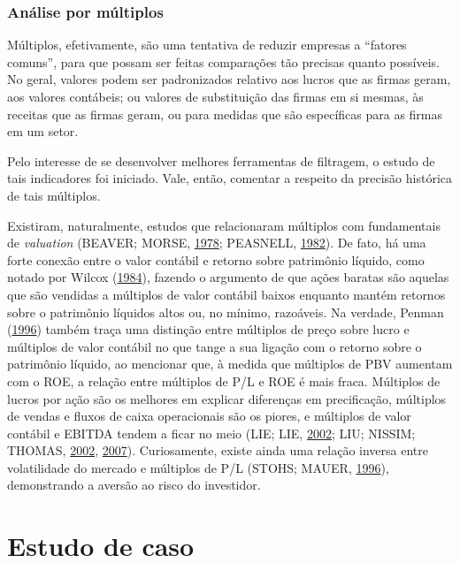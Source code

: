 \documentclass[grad,numbers]{coppe}
\begin{document}
  \hypertarget{anuxe1lise-por-muxfaltiplos}{%
  \subsection{Análise por múltiplos}\label{anuxe1lise-por-muxfaltiplos}}

  Múltiplos, efetivamente, são uma tentativa de reduzir empresas a ``fatores comuns'', para que possam ser feitas comparações tão precisas quanto possíveis. No geral, valores podem ser padronizados relativo aos lucros que as firmas geram, aos valores contábeis; ou valores de substituição das firmas em si mesmas, às receitas que as firmas geram, ou para medidas que são específicas para as firmas em um setor.

  Pelo interesse de se desenvolver melhores ferramentas de filtragem, o estudo de tais indicadores foi iniciado. Vale, então, comentar a respeito da precisão histórica de tais múltiplos.

  Existiram, naturalmente, estudos que relacionaram múltiplos com fundamentais de \emph{valuation} (BEAVER; MORSE, \protect\hyperlink{ref-beaver1978}{1978}; PEASNELL, \protect\hyperlink{ref-peasnell1982}{1982}). De fato, há uma forte conexão entre o valor contábil e retorno sobre patrimônio líquido, como notado por Wilcox (\protect\hyperlink{ref-wilcox1984}{1984}), fazendo o argumento de que ações baratas são aquelas que são vendidas a múltiplos de valor contábil baixos enquanto mantém retornos sobre o patrimônio líquidos altos ou, no mínimo, razoáveis. Na verdade, Penman (\protect\hyperlink{ref-penman1996}{1996}) também traça uma distinção entre múltiplos de preço sobre lucro e múltiplos de valor contábil no que tange a sua ligação com o retorno sobre o patrimônio líquido, ao mencionar que, à medida que múltiplos de PBV aumentam com o ROE, a relação entre múltiplos de P/L e ROE é mais fraca. Múltiplos de lucros por ação são os melhores em explicar diferenças em precificação, múltiplos de vendas e fluxos de caixa operacionais são os piores, e múltiplos de valor contábil e EBITDA tendem a ficar no meio (LIE; LIE, \protect\hyperlink{ref-lie2002}{2002}; LIU; NISSIM; THOMAS, \protect\hyperlink{ref-liu2002}{2002}, \protect\hyperlink{ref-liu2007}{2007}). Curiosamente, existe ainda uma relação inversa entre volatilidade do mercado e múltiplos de P/L (STOHS; MAUER, \protect\hyperlink{ref-stohs1996}{1996}), demonstrando a aversão ao risco do investidor.

  \hypertarget{estudo-de-caso}{%
  \chapter{Estudo de caso}\label{estudo-de-caso}}
\end{document}
